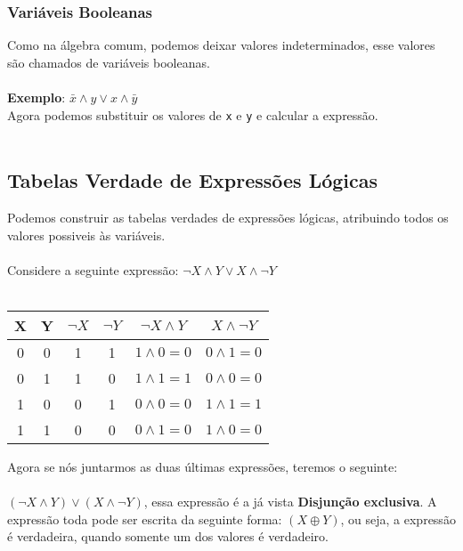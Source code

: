 \documentclass[12pt, onecolumn]{article}
\begin{document}
		\subsubsection{Variáveis Booleanas}
	Como na álgebra comum, podemos deixar valores indeterminados, esse valores
	são chamados de variáveis booleanas.\\
	\\
	\textbf{Exemplo}: $\bar{x} \land y \lor x \land \bar{y}$\\
	Agora podemos substituir os valores de \texttt{x} e \texttt{y} e calcular
	a expressão.\\
	\\
		\subsection{Tabelas Verdade de Expressões Lógicas}

	Podemos construir as tabelas verdades de expressões lógicas, atribuindo
	todos os valores possiveis às variáveis.\\
	\\
	Considere a seguinte expressão: $\lnot{X} \land Y \lor X \land \lnot{Y}$ \\
	\\
	\begin{table}[ht]
		\centering
		\begin{tabular}{|c|c|c|c|c|c|}
			\hline
			X & Y & $\lnot{X}$ & $\lnot{Y}$ & $\lnot X \land Y$
			& $X\land \lnot Y$ \\ \hline

			0 & 0 & 1 & 1 & $1 \land 0 = 0$ & $0 \land 1 = 0$\\
			0 & 1 & 1 & 0 & $1 \land 1 = 1$ & $0 \land 0 = 0$\\
			1 & 0 & 0 & 1 & $0 \land 0 = 0$ & $1 \land 1 = 1$\\
			1 & 1 & 0 & 0 & $0 \land 1 = 0$ & $1 \land 0 = 0$\\
			\hline
		\end{tabular}
	\end{table}

	Agora se nós juntarmos as duas últimas expressões, teremos o seguinte:\\
	\\
	$(\lnot X \land Y) \lor (X \land \lnot Y)$, essa expressão é a já vista
	\textbf{Disjunção exclusiva}. A expressão toda pode ser escrita da seguinte 
	forma: $(X \oplus Y)$, ou seja, a expressão é verdadeira, quando somente um 
	dos valores é verdadeiro.
\end{document}
